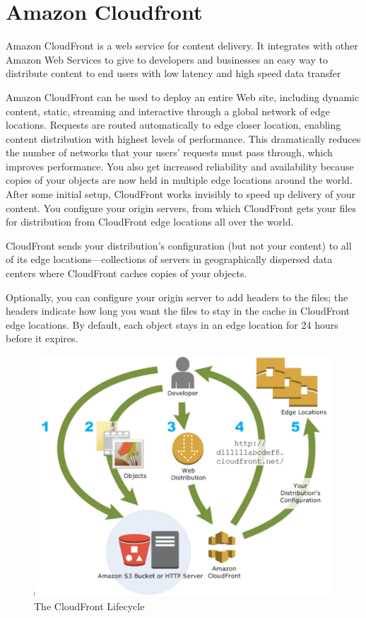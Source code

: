 \section{Amazon Cloudfront}
\label{sec:Amazon Cloudfront}

Amazon CloudFront is a web service for content delivery. It integrates with other Amazon Web Services to give to developers and businesses an easy way to distribute content to end users with low latency and high speed data transfer

Amazon CloudFront can be used to deploy an entire Web site, including dynamic content, static, streaming and interactive through a global network of edge locations. Requests are routed automatically to edge closer location, enabling content distribution with highest levels of performance.
This dramatically reduces the number of networks that your users' requests must pass through, which improves performance.
You also get increased reliability and availability because copies of your objects are now held in multiple edge locations around the world.
After some initial setup, CloudFront works invisibly to speed up delivery of your content.
You configure your origin servers, from which CloudFront gets your files for distribution from CloudFront edge locations all over the world.

CloudFront sends your distribution's configuration (but not your content) to all of its edge locations—collections of servers in geographically dispersed data centers where CloudFront caches copies of your objects.

Optionally, you can configure your origin server to add headers to the files; the headers indicate how long you want the files to stay in the cache in CloudFront edge locations. By default, each object stays in an edge location for 24 hours before it expires.\cite{aws_cloud}



\begin{figure}[htb] %
 \centering
 \includegraphics[width=1.0\linewidth]{images/chapter2/cloudfront.png}\hfill
 \caption[The CloudFront Lifecycle]{The CloudFront Lifecycle}
 \label{fig:fourV}
\end{figure}

